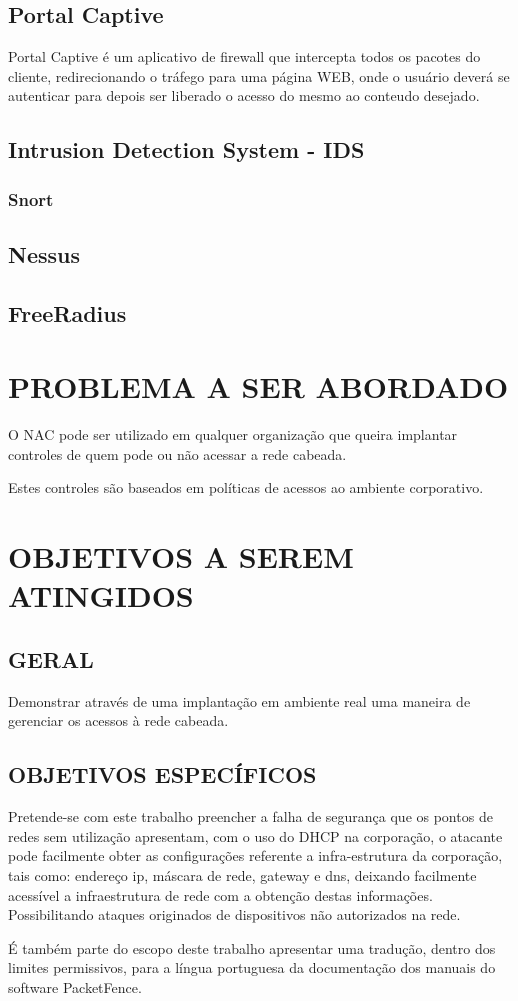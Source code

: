 \documentclass[brazil, ruledheader, pnumromarab,normaltoc]{abnt}
\begin{document}
\section{Portal Captive}
Portal Captive \cite{captive} é um aplicativo de firewall que intercepta todos os pacotes do cliente, redirecionando o tráfego para uma página WEB, onde o usuário deverá se autenticar para depois ser liberado o acesso do mesmo ao conteudo desejado.

\section{Intrusion Detection System - IDS}
\subsection{Snort}


\section{Nessus}


\section{FreeRadius}

\chapter{PROBLEMA A SER ABORDADO}
O NAC pode ser utilizado em qualquer organização que queira implantar controles de quem pode ou não acessar a rede cabeada.
\par
Estes controles são baseados em políticas de acessos ao ambiente corporativo.

\chapter{OBJETIVOS A SEREM ATINGIDOS}
\section{GERAL}
Demonstrar através de uma implantação em ambiente real uma maneira de gerenciar os acessos à rede cabeada.

\section{OBJETIVOS ESPECÍFICOS}
Pretende-se com este trabalho preencher a falha de segurança que os pontos de redes sem utilização apresentam, com o uso do DHCP na corporação, o atacante pode facilmente obter  as configurações referente a infra-estrutura da corporação, tais como: endereço ip, máscara de rede, gateway e dns, deixando facilmente acessível a infraestrutura de rede com a obtenção destas informações. Possibilitando ataques originados de dispositivos não autorizados na rede.
\par
 É também parte do escopo deste trabalho apresentar uma tradução, dentro dos limites permissivos, para a língua portuguesa da documentação dos manuais do software PacketFence.
\end{document}
